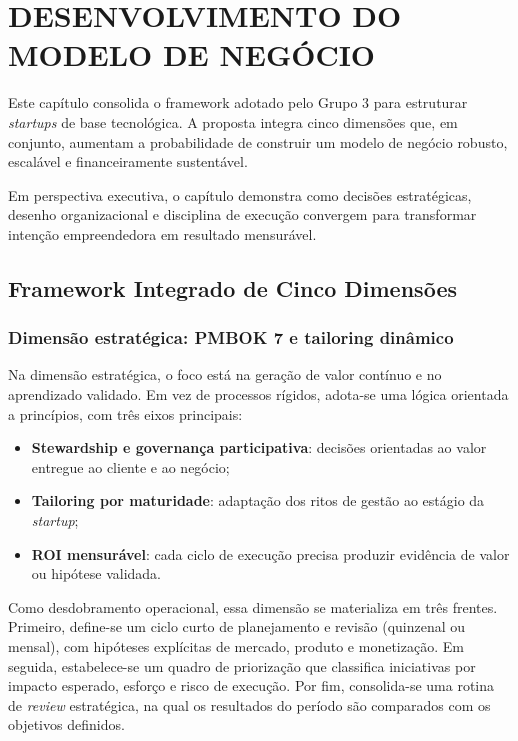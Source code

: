 \chapter{DESENVOLVIMENTO DO MODELO DE NEGÓCIO}
\label{cap:elementos}

Este capítulo consolida o framework adotado pelo Grupo 3 para estruturar \textit{startups} de base tecnológica. A proposta integra cinco dimensões que, em conjunto, aumentam a probabilidade de construir um modelo de negócio robusto, escalável e financeiramente sustentável.

Em perspectiva executiva, o capítulo demonstra como decisões estratégicas, desenho organizacional e disciplina de execução convergem para transformar intenção empreendedora em resultado mensurável.

\section{Framework Integrado de Cinco Dimensões}

\subsection{Dimensão estratégica: PMBOK 7 e tailoring dinâmico}

Na dimensão estratégica, o foco está na geração de valor contínuo e no aprendizado validado. Em vez de processos rígidos, adota-se uma lógica orientada a princípios, com três eixos principais:

\begin{itemize}
    \item \textbf{Stewardship e governança participativa}: decisões orientadas ao valor entregue ao cliente e ao negócio;
    \item \textbf{Tailoring por maturidade}: adaptação dos ritos de gestão ao estágio da \textit{startup};
    \item \textbf{ROI mensurável}: cada ciclo de execução precisa produzir evidência de valor ou hipótese validada.
\end{itemize}

Como desdobramento operacional, essa dimensão se materializa em três frentes. Primeiro, define-se um ciclo curto de planejamento e revisão (quinzenal ou mensal), com hipóteses explícitas de mercado, produto e monetização. Em seguida, estabelece-se um quadro de priorização que classifica iniciativas por impacto esperado, esforço e risco de execução. Por fim, consolida-se uma rotina de \textit{review} estratégica, na qual os resultados do período são comparados com os objetivos definidos.


